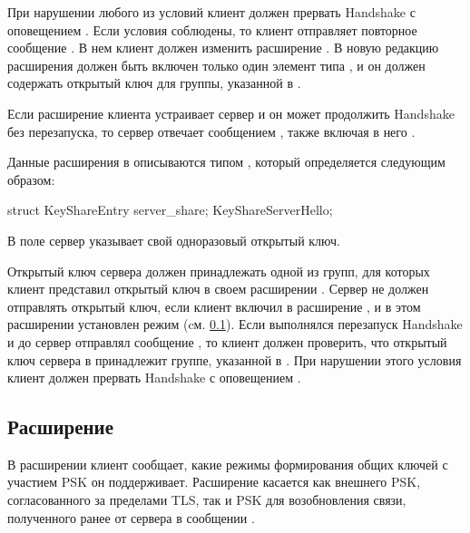 При нарушении любого из условий клиент должен прервать Handshake с оповещением 
. 
%
Если условия соблюдены, то клиент отправляет повторное сообщение 
. В нем клиент должен изменить расширение
. В новую редакцию расширения должен быть включен только один 
элемент типа , и он должен содержать открытый ключ для 
группы, указанной в .

Если расширение  клиента устраивает сервер и он может 
продолжить Handshake без перезапуска, то сервер отвечает сообщением 
, также включая в него .

Данные расширения  в  
описываются типом , который определяется 
следующим образом: 

\begin{codeblock}
struct {
  KeyShareEntry server_share;
} KeyShareServerHello;
\end{codeblock}

В поле  сервер указывает свой одноразовый открытый ключ.

Открытый ключ сервера должен принадлежать одной из групп, для которых клиент 
представил открытый ключ в своем расширении .
%
%
%
Сервер не должен отправлять открытый ключ, если клиент включил в
 расширение
, и в этом расширении установлен
режим  (cм. \ref{HS.Ext.pkem}).
%
Если выполнялся перезапуск Handshake и до  сервер
отправлял сообщение , то клиент должен
проверить, что открытый ключ сервера в  принадлежит
группе, указанной в . При нарушении этого
условия клиент должен прервать Handshake с оповещением
.

\subsection{Расширение }\label{HS.Ext.pkem} 

В расширении  клиент сообщает, какие режимы 
формирования общих ключей с участием PSK он поддерживает.
%
Расширение касается как внешнего PSK, согласованного за пределами TLS, 
так и PSK для возобновления связи, полученного ранее от сервера в сообщении  
.

